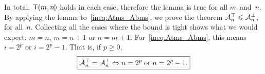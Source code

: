 In total, \(\textsf{T}\llparenthesis{m,n}\rrparenthesis\) holds in each case, therefore the lemma is
true for all \(m\)~and~\(n\). By applying the lemma
to~\eqref{ineq:Atms_Abms}, we prove the theorem \(\mathcal{A}_{n}^{\top}
\leqslant \mathcal{A}_{n}^{\bot}\), for all~\(n\). Collecting all the cases where
the bound is tight shows what we would expect: \(m=n\), \(m=n+1\) or
\(n=m+1\). For~\eqref{ineq:Atms_Abms}, this means \(i=2^p\) or
\(i=2^p-1\). That is, if \(p \geqslant 0\),
\begin{equation*}
\boxed{\mathcal{A}_{n}^{\top} = \mathcal{A}_{n}^{\bot} \Leftrightarrow n=2^p
  \;\text{or}\; n=2^p-1.}
\end{equation*}

